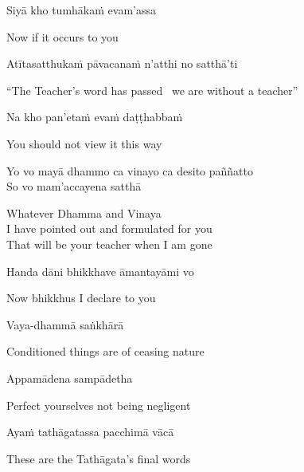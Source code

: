 Siyā kho tumhākaṁ evam'assa

\begin{english}
  Now if it occurs to you
\end{english}

Atītasatthukaṁ pāvacanaṁ n'atthi no satthā'ti

\begin{english}
  ``The Teacher's word has passed \breathmark\ we are without a teacher''
\end{english}

Na kho pan'etaṁ evaṁ daṭṭhabbaṁ

\begin{english}
  You should not view it this way
\end{english}

Yo vo mayā dhammo ca vinayo ca desito paññatto\\
So vo mam'accayena satthā

\begin{english-verses}
  Whatever Dhamma and Vinaya\\
  I have pointed out and formulated for you\\
  That will be your teacher when I am gone
\end{english-verses}

Handa dāni bhikkhave āmantayāmi vo

\begin{english}
  Now bhikkhus I declare to you
\end{english}

Vaya-dhammā saṅkhārā

\begin{english}
  Conditioned things are of ceasing nature\makeatletter\hyperlink{endnote94-appendix}\makeatother
\end{english}

Appamādena sampādetha

\begin{english}
  Perfect yourselves not being negligent
\end{english}

Ayaṁ tathāgatassa pacchimā vācā

\begin{english}
  These are the Tathāgata's final words
\end{english}

\suttaRef{[DN 16]}

\enlargethispage{\baselineskip\vspace{-1.0em}}
